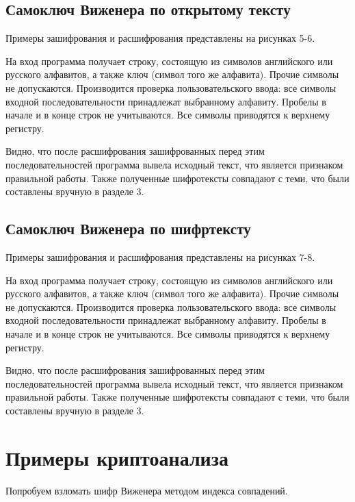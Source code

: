 \subsection{Самоключ Виженера по открытому тексту}
Примеры зашифрования и расшифрования представлены на рисунках 5-6.

На вход программа получает строку, состоящую из символов английского или русского алфавитов, а также ключ (символ того же алфавита). Прочие символы не допускаются. Производится проверка пользовательского ввода: все символы входной последовательности принадлежат выбранному алфавиту. Пробелы в начале и в конце строк не учитываются. Все символы приводятся к верхнему регистру.

Видно, что после расшифрования зашифрованных перед этим последовательностей программа вывела исходный текст, что является признаком правильной работы. Также полученные шифротексты совпадают с теми, что были составлены вручную в разделе 3.
\FloatBarrier
{}
\FloatBarrier


\subsection{Самоключ Виженера по шифртексту}
Примеры зашифрования и расшифрования представлены на рисунках 7-8.

На вход программа получает строку, состоящую из символов английского или русского алфавитов, а также ключ (символ того же алфавита). Прочие символы не допускаются. Производится проверка пользовательского ввода: все символы входной последовательности принадлежат выбранному алфавиту. Пробелы в начале и в конце строк не учитываются. Все символы приводятся к верхнему регистру.

Видно, что после расшифрования зашифрованных перед этим последовательностей программа вывела исходный текст, что является признаком правильной работы. Также полученные шифротексты совпадают с теми, что были составлены вручную в разделе 3.
\clearpage



\section{Примеры криптоанализа}
Попробуем взломать шифр Виженера методом индекса совпадений.

